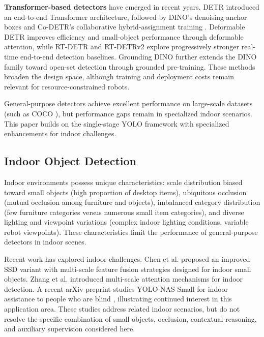 \documentclass[journal]{IEEEtran}
\begin{document}
\textbf{Transformer-based detectors} have emerged in recent years. DETR \cite{carion2020detr} introduced an end-to-end Transformer architecture, followed by DINO's denoising anchor boxes \cite{zhang2022dino} and Co-DETR's collaborative hybrid-assignment training \cite{chen2022codetr}. Deformable DETR \cite{zhu2020deformable} improves efficiency and small-object performance through deformable attention, while RT-DETR \cite{zhao2023rtdetr} and RT-DETRv2 \cite{lv2024rtdetrv2} explore progressively stronger real-time end-to-end detection baselines. Grounding DINO \cite{liu2023groundingdino} further extends the DINO family toward open-set detection through grounded pre-training. These methods broaden the design space, although training and deployment costs remain relevant for resource-constrained robots.

General-purpose detectors achieve excellent performance on large-scale datasets (such as COCO \cite{lin2014microsoft}), but performance gaps remain in specialized indoor scenarios. This paper builds on the single-stage YOLO framework with specialized enhancements for indoor challenges.

\subsection{Indoor Object Detection}

Indoor environments possess unique characteristics: scale distribution biased toward small objects (high proportion of desktop items), ubiquitous occlusion (mutual occlusion among furniture and objects), imbalanced category distribution (few furniture categories versus numerous small item categories), and diverse lighting and viewpoint variations (complex indoor lighting conditions, variable robot viewpoints). These characteristics limit the performance of general-purpose detectors in indoor scenes.

Recent work has explored indoor challenges. Chen et al. \cite{chen2020enhanced} proposed an improved SSD variant with multi-scale feature fusion strategies designed for indoor small objects. Zhang et al. \cite{zhang2021indoor} introduced multi-scale attention mechanisms for indoor detection. A recent arXiv preprint studies YOLO-NAS Small for indoor assistance to people who are blind \cite{bn2024smallindoor}, illustrating continued interest in this application area. These studies address related indoor scenarios, but do not resolve the specific combination of small objects, occlusion, contextual reasoning, and auxiliary supervision considered here.
\end{document}
